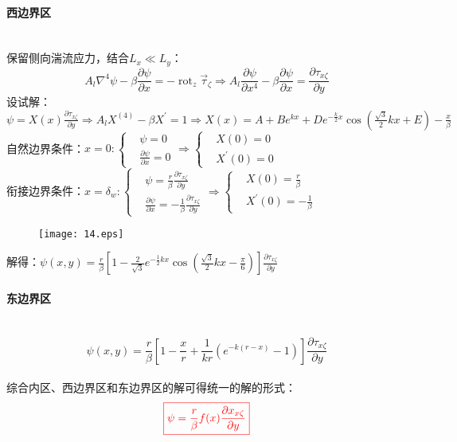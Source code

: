 \documentclass[a4paper,12pt]{article}
\begin{document}
    \paragraph{西边界区}~{}\\
    保留侧向湍流应力，结合$L_x\ll L_y$：
    \[
        A_{l} \nabla^{4} \psi-\beta \frac{\partial \psi}{\partial x}=-\operatorname{rot}_{z} \vec{\tau}_{\zeta}\Rightarrow A_{l} \frac{\partial \psi}{\partial x^{4}}-\beta \frac{\partial \psi}{\partial x}=\frac{\partial \tau_{x \zeta}}{\partial y}
    \]
    设试解：$\displaystyle \psi=X(x) \frac{\partial \tau_{x \zeta}}{\partial y}\Rightarrow A_{l} X^{(4)}-\beta X^{\prime}=1\Rightarrow X(x)=A+B e^{k x}+D e^{-\frac{k}{2} x} \cos \left(\frac{\sqrt{3}}{2} k x+E\right)-\frac{x}{\beta}$
    自然边界条件：$\displaystyle x=0:\left\{\begin{aligned}&\psi=0\\&\frac{\partial \psi}{\partial x}=0\end{aligned}\right.\Rightarrow\left\{\begin{aligned}&X(0)=0\\&X^{\prime}(0)=0\end{aligned}\right.$\\
    衔接边界条件：$\displaystyle x=\delta_w:\left\{\begin{aligned}&\psi=\frac{r}{\beta} \frac{\partial \tau_{x \zeta}}{\partial y}\\&\frac{\partial \psi}{\partial x}=-\frac{1}{\beta} \frac{\partial \tau_{x \zeta}}{\partial y}\end{aligned}\right.\Rightarrow\left\{\begin{aligned}&X(0)=\frac{r}{\beta}\\&X^{\prime}(0)=-\frac{1}{\beta}\end{aligned}\right.$\\
    \begin{figure}[H]
        \centering\texttt{[image: 14.eps]}
        \caption*{}
    \end{figure}
    解得：$\displaystyle\psi(x, y)=\frac{r}{\beta}\left[1-\frac{2}{\sqrt{3}} e^{-\frac{1}{2} k x} \cos \left(\frac{\sqrt{3}}{2} k x-\frac{\pi}{6}\right)\right] \frac{\partial \tau_{x \zeta}}{\partial y} $\\
    \paragraph{东边界区}~{}
    $$\psi(x, y)=\frac{r}{\beta}\left[1-\frac{x}{r}+\frac{1}{k r}\left(e^{-k(r-x)}-1\right)\right] \frac{\partial \tau_{x \zeta}}{\partial y} $$\\
    综合内区、西边界区和东边界区的解可得统一的解的形式：
    \[
        \color{red}
        \boxed{
            \psi=\frac{r}{\beta} f(x) \frac{\partial x_{x \zeta}}{\partial y}
        }
    \]
\end{document}

